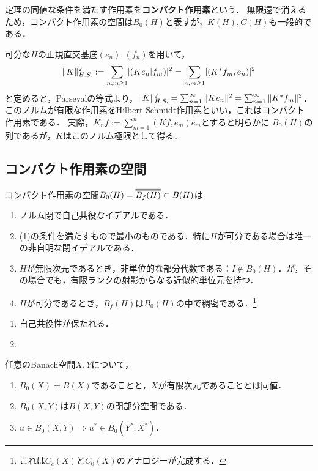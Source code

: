 \documentclass[uplatex,dvipdfmx]{jsreport}
\begin{document}
\begin{definition}
    定理の同値な条件を満たす作用素を\textbf{コンパクト作用素}という．
    無限遠で消えるため，コンパクト作用素の空間は$B_0(H)$と表すが，$K(H),C(H)$も一般的である．
\end{definition}

\begin{example}
    可分な$H$の正規直交基底$(e_n),(f_n)$を用いて，
    \[\|K\|_{H.S.}^2:=\sum_{n,m\ge1}\lvert(Ke_n|f_m)\rvert^2=\sum_{n,m\ge1}\lvert(K^*f_m,e_n)\rvert^2\]
    と定めると，Parsevalの等式より，$\|K\|^2_{H.S.}=\sum^\infty_{n=1}\|Ke_n\|^2=\sum^\infty_{n=1}\|K^*f_m\|^2$．
    このノルムが有限な作用素をHilbert-Schmidt作用素といい，これはコンパクト作用素である．
    実際，$K_nf:=\sum^n_{m=1}(Kf,e_m)e_m$とすると明らかに
    $B_0(H)$の列であるが，$K$はこのノルム極限として得る．
\end{example}

\subsection{コンパクト作用素の空間}

\begin{lemma}[コンパクト作用素の空間の描像]
    コンパクト作用素の空間$B_0(H)=\oo{B_f(H)}\subset B(H)$は
    \begin{enumerate}
        \item ノルム閉で自己共役なイデアルである．
        \item (1)の条件を満たすもので最小のものである．特に$H$が可分である場合は唯一の非自明な閉イデアルである．
        \item $H$が無限次元であるとき，非単位的な部分代数である：$I\notin B_0(H)$．が，その場合でも，有限ランクの射影からなる近似的単位元を持つ．
        \item $H$が可分であるとき，$B_f(H)$は$B_0(H)$の中で稠密である．\footnote{これは$C_c(X)$と$C_0(X)$のアナロジーが完成する．}
    \end{enumerate}
\end{lemma}
\begin{Proof}\mbox{}
    \begin{enumerate}
        \item 自己共役性が保たれる．
        \item 
    \end{enumerate}
\end{Proof}

\begin{proposition}
    任意のBanach空間$X,Y$について，
    \begin{enumerate}
        \item $B_0(X)=B(X)$であることと，$X$が有限次元であることとは同値．
        \item $B_0(X,Y)$は$B(X,Y)$の閉部分空間である．
        \item $u\in B_0(X,Y)\Rightarrow u^*\in B_0(Y^*,X^*)$．
    \end{enumerate}
\end{proposition}
\end{document}
